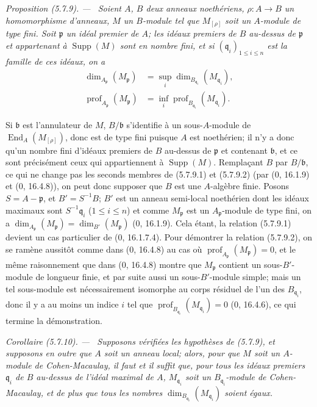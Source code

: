 \documentclass[10pt,oneside]{book}
\newenvironment{proposition}[1][]{%
  \par\medskip\noindent\itshape Proposition (#1). ---\ }{\par}
\newenvironment{corollary}[1][]{%
  \par\medskip\noindent\itshape Corollaire (#1). ---\ }{\par}
\begin{document}
\begin{proposition}[5.7.9]
\label{IV.2.s5.7.9-fr}
Soient $A$, $B$ deux anneaux noethériens, $\rho:A\to B$ un homomorphisme
d'anneaux, $M$ un $B$-module tel que $M_{[\rho]}$ soit un $A$-module de type
fini. Soit $\mathfrak p$ un idéal premier de $A$; les idéaux premiers de $B$
au-dessus de $\mathfrak p$ et appartenant à $\operatorname{Supp}(M)$ sont en
nombre fini, et si $(\mathfrak q_i)_{1\leq i\leq n}$ est la famille de ces
idéaux, on a
\begin{align}
\dim_{A_{\mathfrak p}}(M_{\mathfrak p})
&=\sup_i\dim_{B_{\mathfrak q_i}}(M_{\mathfrak q_i}),
\tag{5.7.9.1}\label{IV.2.s5.7.9.1-fr}\\
\operatorname{prof}_{A_{\mathfrak p}}(M_{\mathfrak p})
&=\inf_i\operatorname{prof}_{B_{\mathfrak q_i}}(M_{\mathfrak q_i}).
\tag{5.7.9.2}\label{IV.2.s5.7.9.2-fr}
\end{align}
\end{proposition}

Si $\mathfrak b$ est l'annulateur de $M$, $B/\mathfrak b$ s'identifie à un
sous-$A$-module de $\operatorname{End}_A(M_{[\rho]})$, donc est de type fini
puisque $A$ est noethérien; il n'y a donc qu'un nombre fini d'idéaux premiers
de $B$ au-dessus de $\mathfrak p$ et contenant $\mathfrak b$, et ce sont
précisément ceux qui appartiennent à $\operatorname{Supp}(M)$. Remplaçant
$B$ par $B/\mathfrak b$, ce qui ne change pas les seconds membres de
(5.7.9.1) et (5.7.9.2) (par (0, 16.1.9) et (0, 16.4.8)), on peut donc
supposer que $B$ est une $A$-algèbre finie. Posons $S=A-\mathfrak p$, et
$B'=S^{-1}B$; $B'$ est un anneau semi-local noethérien dont les idéaux
maximaux sont $S^{-1}\mathfrak q_i$ ($1\leq i\leq n$) et comme
$M_{\mathfrak p}$ est un $A_{\mathfrak p}$-module de type fini, on a
$\dim_{A_{\mathfrak p}}(M_{\mathfrak p})=\dim_{B'}(M_{\mathfrak p})$
(0, 16.1.9). Cela étant, la relation (5.7.9.1) devient un cas particulier de
(0, 16.1.7.4). Pour démontrer la relation (5.7.9.2), on se ramène aussitôt
comme dans (0, 16.4.8) au cas où
$\operatorname{prof}_{A_{\mathfrak p}}(M_{\mathfrak p})=0$, et le même
raisonnement que dans (0, 16.4.8) montre que $M_{\mathfrak p}$ contient un
sous-$B'$-module de longueur finie, et par suite aussi un sous-$B'$-module
simple; mais un tel sous-module est nécessairement isomorphe au corps
résiduel de l'un des $B_{\mathfrak q_i}$, donc il y a au moins un indice $i$
tel que
$\operatorname{prof}_{B_{\mathfrak q_i}}(M_{\mathfrak q_i})=0$
(0, 16.4.6), ce qui termine la démonstration.

\begin{corollary}[5.7.10]
\label{IV.2.s5.7.10-fr}
Supposons vérifiées les hypothèses de (5.7.9), et supposons en outre que $A$
soit un anneau local; alors, pour que $M$ soit un $A$-module de
Cohen-Macaulay, il faut et il suffit que, pour tous les idéaux premiers
$\mathfrak q_i$ de $B$ au-dessus de l'idéal maximal de $A$,
$M_{\mathfrak q_i}$ soit un $B_{\mathfrak q_i}$-module de Cohen-Macaulay, et
de plus que tous les nombres
$\dim_{B_{\mathfrak q_i}}(M_{\mathfrak q_i})$ soient égaux.
\end{corollary}
\end{document}
